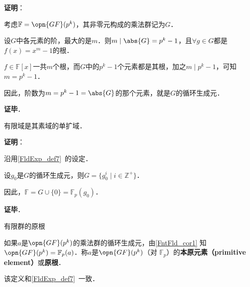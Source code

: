 \textbf{证明}：

考虑$\mathbb{F}=\opn{GF}(p^k)$，其非零元构成的乘法群记为$G$．

设$G$中各元素的阶，最大的是$m$．则$m\mid \abs{G} = p^k-1$，且$\forall g\in G$都是$f(x)=x^m-1$的根．

$f\in\mathbb{F}[x]$一共$m$个根，而$G$中的$p^k-1$个元素都是其根，加之$m\mid p^k-1$，可知$m=p^k-1$．

因此，阶数为$m=p^k-1=\abs{G}$的那个元素，就是$G$的循环生成元．

\textbf{证毕}．

\begin{corollary}{}\label{FntFld_cor1}
有限域是其素域的单扩域．
\end{corollary}

\textbf{证明}：

沿用\autoref{FldExp_def7}~的设定．

设$g_0$是$G$的循环生成元，则$G=\{g_0^i\mid i\in\mathbb{Z}^+\}$．

因此，$\mathbb{F}=G\cup\{0\}=\mathbb{F}_p(g_0)$．

\textbf{证毕}．

\begin{definition}{有限群的原根}

如果$a$是$\opn{GF}(p^k)$的乘法群的循环生成元，由\autoref{FntFld_cor1} 知$\opn{GF}(p^k)=\mathbb{F}_p(a)$．称$a$是$\opn{GF}(p^k)$（对 $\mathbb{F}_p$）的\textbf{本原元素（primitive element）}或\textbf{原根}．

该定义和\autoref{FldExp_def7}~一致．

\end{definition}


